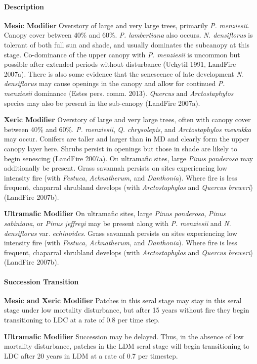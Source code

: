 \paragraph{Description}
\begin{adjustwidth}{2cm}{}
\textbf{Mesic Modifier } Overstory of large and very large trees, primarily \emph{P. menziesii}. Canopy cover between 40\% and 60\%. \emph{P. lambertiana} also occurs. \emph{N. densiflorus} is tolerant of both full sun and shade, and usually dominates the subcanopy at this stage. Co-dominance of the upper canopy with \emph{P. menziesii} is uncommon but possible after extended periods without disturbance (Uchytil 1991, LandFire 2007a). There is also some evidence that the senescence of late development \emph{N. densiflorus} may cause openings in the canopy and allow for continued \emph{P. menziesii} dominance (Estes pers. comm. 2013). \emph{Quercus} and \emph{Arctostaphylos} species may also be present in the sub-canopy (LandFire 2007a).

\medskip
\noindent \textbf{Xeric Modifier} Overstory of large and very large trees, often with canopy cover between 40\% and 60\%. \emph{P. menziesii}, \emph{Q. chrysolepis}, and \emph{Arctostaphylos mewukka} may occur. Conifers are taller and larger than in MD and clearly form the upper canopy layer here. Shrubs persist in openings but those in shade are likely to begin senescing (LandFire 2007a). On ultramafic sites, large \emph{Pinus ponderosa} may additionally be present. Grass savannah persists on sites experiencing low intensity fire (with \emph{Festuca}, \emph{Achnatherum}, and \emph{Danthonia}). Where fire is less frequent, chaparral shrubland develops (with \emph{Arctostaphylos} and \emph{Quercus breweri}) (LandFire 2007b).

\medskip
\noindent \textbf{Ultramafic Modifier} On ultramafic sites, large \emph{Pinus ponderosa}, \emph{Pinus sabiniana}, or \emph{Pinus jeffreyi} may be present along with \emph{P. menziesii} and \emph{N. densiflorus} var. \emph{echinoides}. Grass savannah persists on sites experiencing low intensity fire (with \emph{Festuca}, \emph{Achnatherum}, and \emph{Danthonia}). Where fire is less frequent, chaparral shrubland develops (with \emph{Arctostaphylos} and \emph{Quercus breweri}) (LandFire 2007b).

\end{adjustwidth}
\paragraph{Succession Transition}
\begin{adjustwidth}{2cm}{}
\textbf{Mesic and Xeric Modifier } Patches in this seral stage may stay in this seral stage under low mortality disturbance, but after 15 years without fire they begin transitioning to LDC at a rate of 0.8 per time step. 

\medskip
\noindent \textbf{Ultramafic Modifier} Succession may be delayed. Thus, in the absence of low mortality disturbance, patches in the LDM seral stage will begin transitioning to LDC after 20 years in LDM at a rate of 0.7 per timestep. 

\end{adjustwidth}
